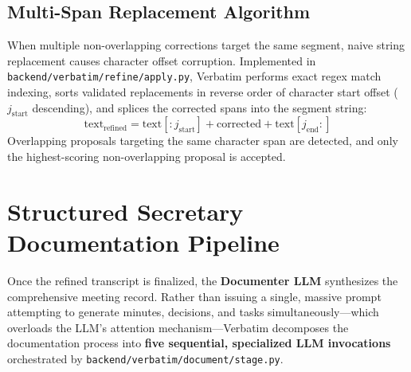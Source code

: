 \documentclass[10pt,a4paper]{article}
\begin{document}
\subsection{Multi-Span Replacement Algorithm}
When multiple non-overlapping corrections target the same segment, naive string replacement causes character offset corruption. Implemented in \texttt{backend/verbatim/refine/apply.py}, Verbatim performs exact regex match indexing, sorts validated replacements in reverse order of character start offset ($j_{\text{start}}$ descending), and splices the corrected spans into the segment string:
\begin{equation}
\text{text}_{\text{refined}} = \text{text}[:j_{\text{start}}] + \text{corrected} + \text{text}[j_{\text{end}}:]
\end{equation}
Overlapping proposals targeting the same character span are detected, and only the highest-scoring non-overlapping proposal is accepted.

\section{Structured Secretary Documentation Pipeline}
\label{sec:documentation}

Once the refined transcript is finalized, the \textbf{Documenter LLM} synthesizes the comprehensive meeting record. Rather than issuing a single, massive prompt attempting to generate minutes, decisions, and tasks simultaneously—which overloads the LLM's attention mechanism—Verbatim decomposes the documentation process into \textbf{five sequential, specialized LLM invocations} orchestrated by \texttt{backend/verbatim/document/stage.py}.
\end{document}
